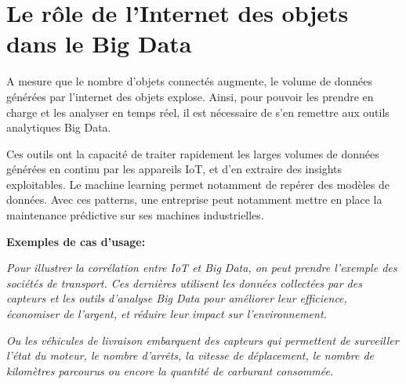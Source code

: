 \section{Le rôle de l’Internet des objets dans le Big Data}
A mesure que le nombre d’objets connectés augmente, le volume de données générées par l’internet des objets explose. Ainsi, pour pouvoir les prendre en charge et les analyser en temps réel, il est nécessaire de s’en remettre aux outils analytiques Big Data.

Ces outils ont la capacité de traiter rapidement les larges volumes de données générées en continu par les appareils IoT, et d’en extraire des insights exploitables. Le machine learning permet notamment de repérer des modèles de données. Avec ces patterns, une entreprise peut notamment mettre en place la maintenance prédictive sur ses machines industrielles.

\textbf{Exemples de cas d’usage:}

\textit{Pour illustrer la corrélation entre IoT et Big Data, on peut prendre l’exemple des sociétés de transport. Ces dernières utilisent les données collectées par des capteurs et les outils d’analyse Big Data pour améliorer leur efficience, économiser de l’argent, et réduire leur impact sur l’environnement.}

\textit{Ou les véhicules de livraison embarquent des capteurs qui permettent de surveiller l’état du moteur, le nombre d’arrêts, la vitesse de déplacement, le nombre de kilomètres parcourus ou encore la quantité de carburant consommée.}

